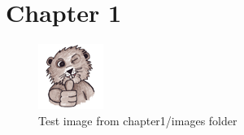 \chapter{Chapter 1}

\begin{figure}[H]
	\begin{center}
		\includegraphics{content/chapter1/images/beaver}
		\caption{Test image from chapter1/images folder}
	\end{center}
\end{figure}
